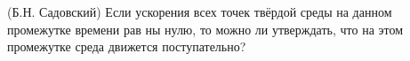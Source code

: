 (Б.Н. Садовский)
Если ускорения всех точек твёрдой среды на данном промежутке времени рав
ны нулю, то можно ли утверждать, что на этом промежутке среда движется 
поступательно?
